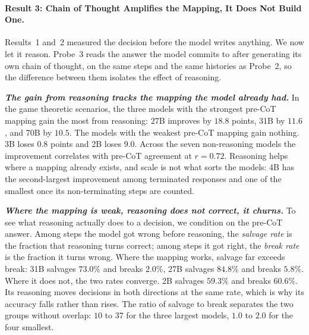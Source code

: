 %

\paragraph{Result 3: Chain of Thought Amplifies the Mapping, It Does Not Build One.}

Results~1 and~2 measured the decision before the model writes anything. We now
let it reason. Probe~3 reads the answer the model commits to after generating
its own chain of thought, on the same steps and the same histories as Probe~2,
so the difference between them isolates the effect of reasoning.

\textbf{\textit{The gain from reasoning tracks the mapping the model already
had.}}
In the game theoretic scenarios, the three models with the strongest pre-CoT
mapping gain the most from reasoning:  27B improves by
\(18.8\) points,  31B by \(11.6\), and  70B by
\(10.5\). The models with the weakest pre-CoT mapping gain nothing.
 3B loses \(0.8\) points and  2B loses
\(9.0\). Across the seven non-reasoning models the improvement correlates with
pre-CoT agreement at \(r=0.72\). Reasoning helps where a mapping already
exists, and scale is not what sorts the models:  4B has the
second-largest improvement among terminated responses and one of the smallest
once its non-terminating steps are counted.

\textbf{\textit{Where the mapping is weak, reasoning does not correct, it
churns.}}
To see what reasoning actually does to a decision, we condition on the pre-CoT
answer. Among steps the model got wrong before reasoning, the \emph{salvage
rate} is the fraction that reasoning turns correct; among steps it got right,
the \emph{break rate} is the fraction it turns wrong. Where the mapping works,
salvage far exceeds break:  31B salvages \(73.0\%\) and breaks
\(2.0\%\),  27B salvages \(84.8\%\) and breaks \(5.8\%\).
Where it does not, the two rates converge.  2B salvages
\(59.3\%\) and breaks \(60.6\%\). Its reasoning moves decisions in both
directions at the same rate, which is why its accuracy falls rather than
rises. The ratio of salvage to break separates the two groups without overlap:
\(10\) to \(37\) for the three largest models, \(1.0\) to \(2.0\) for the four
smallest.

